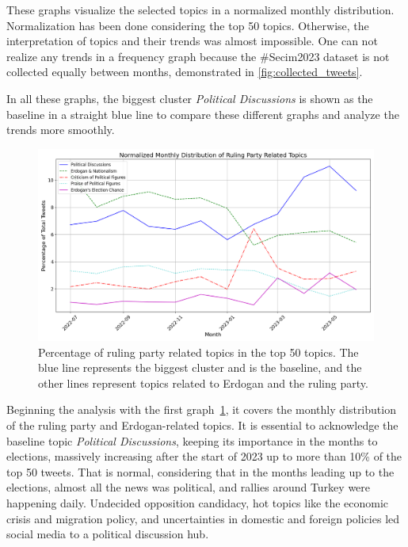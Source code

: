 These graphs visualize the selected topics in a normalized monthly distribution. 
Normalization has been done considering the top 50 topics. Otherwise, the interpretation of topics 
and their trends was almost impossible. One can not realize any trends in a frequency graph because 
the \#Secim2023 dataset is not collected equally between months, demonstrated in \autoref{fig:collected_tweets}.

In all these graphs, the biggest cluster \textit{Political Discussions} is shown as the baseline 
in a straight blue line to compare these different graphs and analyze the trends more smoothly. 

\begin{figure}[htb]
    \centering
    \includegraphics[width=\linewidth]{figures/normalized_akp_selected_topics_distribution_with_styles.png}
    \caption[Normalized monthly distribution of ruling party related topics]
    {Percentage of ruling party related topics in the top 50 topics. 
    The blue line represents the biggest cluster and is the baseline, 
    and the other lines represent topics related to Erdogan and the ruling party.}\label{fig:topics_graph_akp}
\end{figure}

Beginning the analysis with the first graph~\ref{fig:topics_graph_akp}, 
it covers the monthly distribution of the ruling party and Erdogan-related topics. 
It is essential to acknowledge the baseline topic \textit{Political Discussions}, 
keeping its importance in the months to elections, massively increasing after the start of 2023 up 
to more than 10\% of the top 50 tweets. That is normal, considering that in the months leading up 
to the elections, almost all the news was political, and rallies around Turkey were happening daily. 
Undecided opposition candidacy, hot topics like the economic crisis and migration policy, and 
uncertainties in domestic and foreign policies led social media to a political discussion hub.

